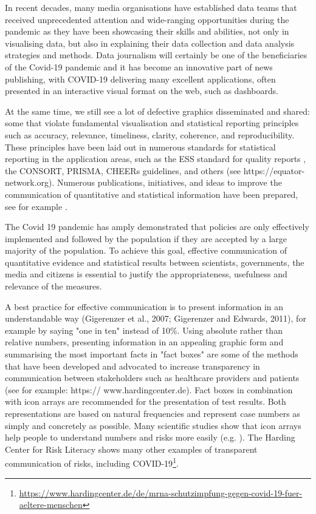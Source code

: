 \documentclass[article]{jdssv}\usepackage[]{graphicx}\usepackage[]{color}
\begin{document}
In recent decades, many media organisations have established data teams that received unprecedented attention and wide-ranging opportunities during the pandemic as they have been showcasing their skills and abilities, not only in visualising data, but also in explaining their data collection and data analysis strategies and methods. Data journalism will certainly be one of the beneficiaries of the Covid-19 pandemic and it has become an innovative part of news publishing, with COVID-19 delivering many excellent applications, often presented in an interactive visual format on the web, such as dashboards.


At the same time, we still see a lot of defective graphics disseminated and shared: some that violate fundamental visualisation and statistical reporting principles such as accuracy, relevance, timeliness, clarity, coherence, and reproducibility. These principles have been laid out in numerous standards for statistical reporting in the application areas, such as the ESS standard for quality reports \citep{ess2009}, the CONSORT, PRISMA, CHEERs guidelines, and others (see https://equator-network.org). Numerous publications, initiatives, and ideas to improve the communication of quantitative and statistical information have been prepared, see for example \cite{Hoffrage2261,Tufte2001,Rosling2011,otavamylona2020}.

The Covid 19 pandemic has amply demonstrated that policies are only effectively implemented and followed by the population if they are accepted by a large majority of the population. To achieve this goal, effective communication of quantitative evidence and statistical results between scientists, governments, the media and citizens is essential to justify the appropriateness, usefulness and relevance of the measures. 

A best practice for effective communication is to present information in an understandable way (Gigerenzer et al., 2007; Gigerenzer and Edwards, 2011), for example by saying "one in ten" instead of 10\%. Using absolute rather than relative numbers, presenting information in an appealing graphic form and summarising the most important facts in "fact boxes" are some of the methods that have been developed and advocated to increase transparency in communication between stakeholders such as healthcare providers and patients (see for example: https:// www.hardingcenter.de).
Fact boxes in combination with icon arrays are recommended for the presentation of test results. Both representations are based on natural frequencies \citep{[62],Krauss2020} and represent case numbers as simply and concretely as possible. Many scientific studies show that icon arrays help people to understand numbers and risks more easily (e.g. \cite{McDowell2019}). The Harding Center for Risk Literacy shows many other examples of transparent communication of risks, including COVID-19\footnote{\url{https://www.hardingcenter.de/de/mrna-schutzimpfung-gegen-covid-19-fuer-aeltere-menschen}}.
\end{document}
